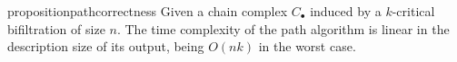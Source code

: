 \documentclass[a4paper,UKenglish,cleveref,nolineno,autoref]{socg-lipics-v2021}
\begin{document}



\begin{restatable}{proposition}{pathcorrectness}
\label{prop:path_complexity}
Given a chain complex $C_\bullet$ induced by a $k$-critical bifiltration of size $n$. The time complexity of the path algorithm is linear in the description size of its output, being $O(nk)$ in the worst case. 
\end{restatable}
\end{document}
